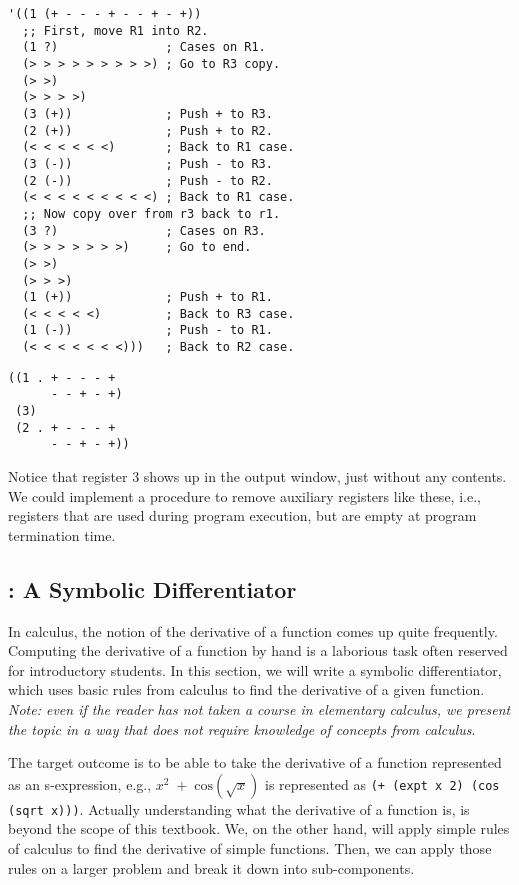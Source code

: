\begin{clo}[]{}
\begin{lstlisting}[language=MyVOutput]
'((1 (+ - - - + - - + - +))
  ;; First, move R1 into R2.
  (1 ?)               ; Cases on R1.
  (> > > > > > > > >) ; Go to R3 copy.
  (> >)
  (> > > >)
  (3 (+))             ; Push + to R3.
  (2 (+))             ; Push + to R2.
  (< < < < < <)       ; Back to R1 case.
  (3 (-))             ; Push - to R3.
  (2 (-))             ; Push - to R2.
  (< < < < < < < < <) ; Back to R1 case.
  ;; Now copy over from r3 back to r1.
  (3 ?)               ; Cases on R3.
  (> > > > > > >)     ; Go to end.
  (> >)
  (> > >)
  (1 (+))             ; Push + to R1.
  (< < < < <)         ; Back to R3 case.
  (1 (-))             ; Push - to R1.
  (< < < < < < <)))   ; Back to R2 case.
\end{lstlisting}
\tcblower
\begin{lstlisting}[language=MyVOutput]
((1 . + - - - + 
      - - + - +) 
 (3) 
 (2 . + - - - + 
      - - + - +))
\end{lstlisting}
\end{clo}

Notice that register 3 shows up in the output window, just without any contents. We could implement a procedure to remove auxiliary registers like these, i.e., registers that are used during program execution, but are empty at program termination time.

\clearpage
\subsection*{: A Symbolic Differentiator}

In calculus, the notion of the derivative of a function comes up quite frequently. Computing the derivative of a function by hand is a laborious task often reserved for introductory students. In this section, we will write a symbolic differentiator, which uses basic rules from calculus to find the derivative of a given function. \textit{Note: even if the reader has not taken a course in elementary calculus, we present the topic in a way that does not require knowledge of concepts from calculus}.

The target outcome is to be able to take the derivative of a function represented as an s-expression, e.g., $x^2\;+\;\text{cos}(\sqrt{x})$ is represented as \texttt{(+ (expt x 2) (cos (sqrt x)))}. Actually understanding what the derivative of a function is, is beyond the scope of this textbook. We, on the other hand, will apply simple rules of calculus to find the derivative of simple functions. Then, we can apply those rules on a larger problem and break it down into sub-components.

